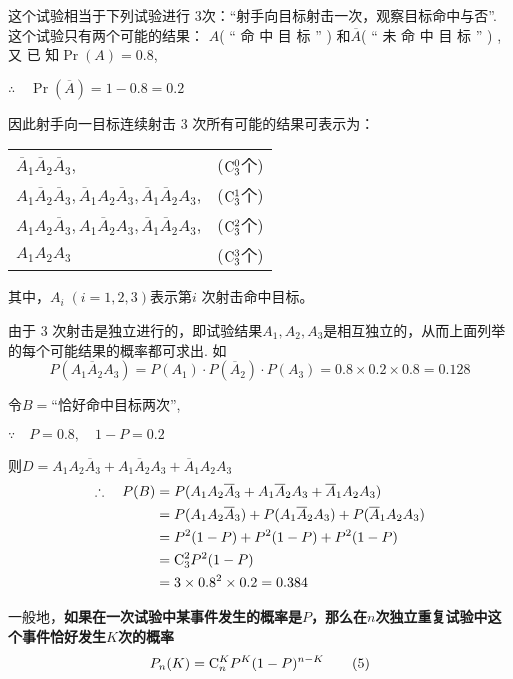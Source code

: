 \begin{solution}
这个试验相当于下列试验进行 3次：“射手向目标射击一次，观察目标命中与否”. 这个试验只有两个可能的结果： $A$( “ 命 中 目 标 ” ) 和$\overline {A}$( “ 未 命 中 目 标 ” ) , 又 已 知$\Pr( A) = 0. 8$,

$\therefore\quad \Pr(\overline{A})=1-0.8=0.2$

因此射手向一目标连续射击 3 次所有可能的结果可表示为：
\begin{center}
\begin{tabular}{p{}c}
    $\overline{A}_1\overline{A}_2\overline{A}_3$, & (${\rm C}_3^0$个)\\
   $A_{1} \overline{A}_{2} \overline{A}_{3}, \overline{A}_{1}A_{2} \overline{A}_{3}, \overline{A}_{1} \overline{A}_{2}A_{3}$,  & (${\rm C}_3^1$个)\\
   $A_{1}A_{2} \overline{A}_{3},A_{1} \overline{A}_{2}A_{3}, \overline{A}_{1} \overline{A}_{2}A_{3}$,
& (${\rm C}_3^2$个)\\
$A_1A_2A_3$ & (${\rm C}_3^3$个)
\end{tabular}
\end{center}
其中，$A_i\; (i=1,2,3)$表示第$i$ 次射击命中目标。

由于 3 次射击是独立进行的，即试验结果$A_1,A_2,A_3$是相互独立的，从而上面列举的每个可能结果的概率都可求出. 如
$$P(A_{1}\overline{A}_{2}A_{3})=P(A_{1})\cdot P( \overline{A}_{2})\cdot P(A_{3})=0.8\times0.2\times0.8=0.128$$

令$B=$“恰好命中目标两次”,

$\because\quad  P=0.8,\quad 1-P=0.2$

则$D=A_{1}A_{2}\overline{A}_{3}+A_{1}\overline{A}_{2}A_{3}+\overline{A}_{1}A_{2}A_{3}$
\[\begin{split}
    \therefore\quad P(B)&=P(A_{1}A_{2} \overline{A}_{3}+A_{1} \overline{A}_{2}A_{3}+ \overline{A}_{1}A_{2}A_{3})\\
    &=P(A_{1}A_{2} \overline{A}_{3})+P(A_{1} \overline{A}_{2}A_{3})+P( \overline{A}_{1}A_{2}A_{3})\\
    &=P^{2}(1-P)+P^{2}(1-P)+P^{2}(1-P)\\
    &={\rm C}_{3}^{2}P^{2}(1-P)\\
    &=3\times0.8^{2}\times0.2=0.384
\end{split}\]
\end{solution}

一般地，\textbf{如果在一次试验中某事件发生的概率是$P$，那么在$n$次独立重复试验中这个事件恰好发生$K$次的概率}
\begin{equation}
    P_n(K)={\rm C}^K_n P^K (1-P)^{n-K}\tag{5}
\end{equation}


